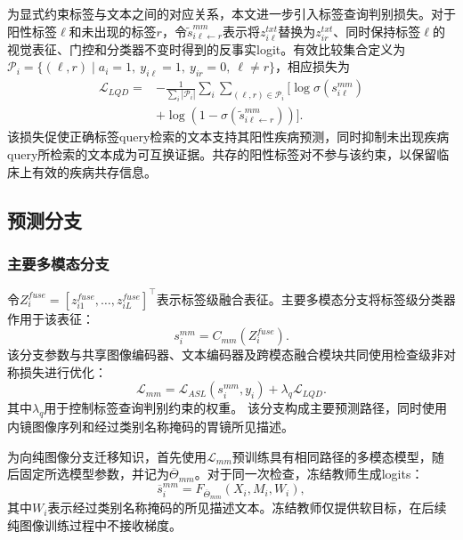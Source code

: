 \documentclass[Afour,sagev,times]{sagej}
\begin{document}
为显式约束标签与文本之间的对应关系，本文进一步引入标签查询判别损失。对于阳性标签$\ell$和未出现的标签$r$，令$\widetilde{s}_{i\ell\leftarrow r}^{mm}$表示将$z_{i\ell}^{txt}$替换为$z_{ir}^{txt}$、同时保持标签$\ell$的视觉表征、门控和分类器不变时得到的反事实logit。有效比较集合定义为$\mathcal{P}_i=\{(\ell,r)\mid a_i=1,\ y_{i\ell}=1,\ y_{ir}=0,\ \ell\neq r\}$，相应损失为
\begin{equation}
\begin{aligned}
\mathcal{L}_{LQD}={}&-\frac{1}{\sum_i|\mathcal{P}_i|}
\sum_i\sum_{(\ell,r)\in\mathcal{P}_i}\Big[
\log\sigma(s_{i\ell}^{mm})\\
&+\log\left(1-\sigma(\widetilde{s}_{i\ell\leftarrow r}^{mm})\right)\Big].
\end{aligned}
\end{equation}
该损失促使正确标签query检索的文本支持其阳性疾病预测，同时抑制未出现疾病query所检索的文本成为可互换证据。共存的阳性标签对不参与该约束，以保留临床上有效的疾病共存信息。

\subsection{预测分支}

\subsubsection{主要多模态分支}

令$Z_i^{fuse}=[z_{i1}^{fuse},\ldots,z_{iL}^{fuse}]^{\top}$表示标签级融合表征。主要多模态分支将标签级分类器作用于该表征：
\begin{equation}
s_i^{mm}=C_{mm}(Z_i^{fuse}).
\end{equation}
该分支参数与共享图像编码器、文本编码器及跨模态融合模块共同使用检查级非对称损失进行优化：
\begin{equation}
\mathcal{L}_{mm}=\mathcal{L}_{ASL}(s_i^{mm},y_i)+\lambda_q\mathcal{L}_{LQD}.
\end{equation}
其中$\lambda_q$用于控制标签查询判别约束的权重。
该分支构成主要预测路径，同时使用内镜图像序列和经过类别名称掩码的胃镜所见描述。

为向纯图像分支迁移知识，首先使用$\mathcal{L}_{mm}$预训练具有相同路径的多模态模型，随后固定所选模型参数，并记为$\overline{\Theta}_{mm}$。对于同一次检查，冻结教师生成logits：
\begin{equation}
\overline{s}_i^{mm}=F_{\overline{\Theta}_{mm}}(X_i,M_i,W_i),
\end{equation}
其中$W_i$表示经过类别名称掩码的所见描述文本。冻结教师仅提供软目标，在后续纯图像训练过程中不接收梯度。
\end{document}
